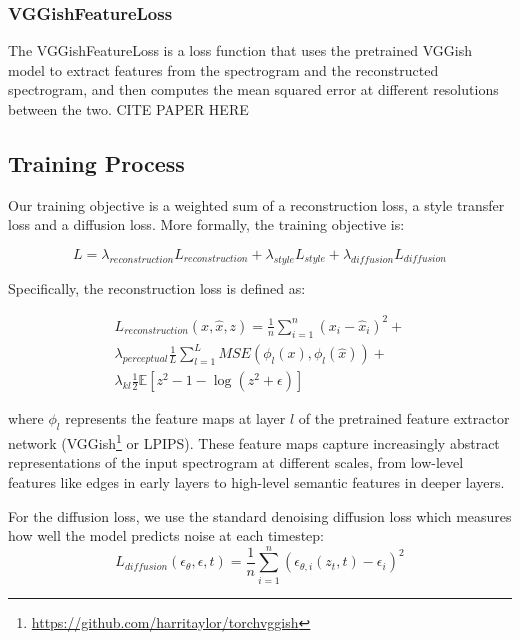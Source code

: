 \subsubsection{VGGishFeatureLoss}
The VGGishFeatureLoss is a loss function that uses the pretrained VGGish model to extract features from the spectrogram and the reconstructed spectrogram, and then computes the mean squared error at different resolutions between the two. CITE PAPER HERE


\subsection{Training Process}

Our training objective is a weighted sum of a reconstruction loss, a style transfer loss and a diffusion loss. More formally, the training objective is:

\begin{equation}
    L = \lambda_{reconstruction}L_{reconstruction} + \lambda_{style}L_{style} + \lambda_{diffusion}L_{diffusion}
\end{equation}

\noindent Specifically, the reconstruction loss is defined as:

\begin{equation}
    \begin{split}
    L_{reconstruction}(x, \hat{x}, z) = \frac{1}{n}\sum_{i=1}^{n}(x_i - \hat{x}_i)^2 + \\
    \lambda_{perceptual} \frac{1}{L}\sum_{l=1}^{L} MSE(\phi_l(x), \phi_l(\hat{x})) + \\
    \lambda_{kl} \frac{1}{2}\mathbb{E}[z^2 - 1 - \log(z^2 + \epsilon)]
    \end{split}
\end{equation}

\noindent where $\phi_l$ represents the feature maps at layer $l$ of the pretrained feature extractor network (VGGish\footnote{\url{https://github.com/harritaylor/torchvggish}} or LPIPS). These feature maps capture increasingly abstract representations of the input spectrogram at different scales, from low-level features like edges in early layers to high-level semantic features in deeper layers.

\vspace{1em}

\noindent For the diffusion loss, we use the standard denoising diffusion loss which measures how well the model predicts noise at each timestep:
\begin{equation}
L_{diffusion}(\epsilon_\theta, \epsilon, t) = \frac{1}{n}\sum_{i=1}^{n}(\epsilon_{\theta,i}(z_t, t) - \epsilon_i)^2
\end{equation}

